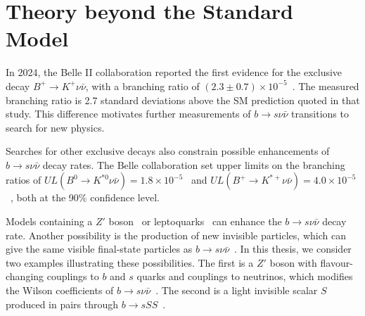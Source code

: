 \section{Theory beyond the Standard Model}
In 2024, the Belle II collaboration reported the first evidence for the exclusive decay $B^{+}\rightarrow K^{+}\nu\bar{\nu}$, with a branching ratio of $(2.3\pm0.7)\times10^{-5}$~\cite{Belle-II:2023esi}.
The measured branching ratio is 2.7 standard deviations above the SM prediction quoted in that study.
This difference motivates further measurements of $b\rightarrow s\nu\bar{\nu}$ transitions to search for new physics.

Searches for other exclusive decays also constrain possible enhancements of $b\rightarrow s\nu\bar{\nu}$ decay rates.
The Belle collaboration set upper limits on the branching ratios of $UL(B^{0}\rightarrow K^{*0}\nu\bar{\nu})=1.8\times10^{-5}$~\cite{Belle:2017oht} and $UL(B^{+}\rightarrow K^{*+}\nu\bar{\nu})=4.0\times10^{-5}$~\cite{Belle:2013tnz}, both at the 90\% confidence level.

Models containing a $Z'$ boson~\cite{Altmannshofer:2009ma} or leptoquarks~\cite{Sahoo:2016pet} can enhance the $b\rightarrow s\nu\bar{\nu}$ decay rate.
Another possibility is the production of new invisible particles, which can give the same visible final-state particles as $b\rightarrow s\nu\bar{\nu}$~\cite{Calcuttawala:2017usw}.
In this thesis, we consider two examples illustrating these possibilities.
The first is a $Z'$ boson with flavour-changing couplings to $b$ and $s$ quarks and couplings to neutrinos, which modifies the Wilson coefficients of $b\rightarrow s\nu\bar{\nu}$~\cite{Altmannshofer:2009ma}.
The second is a light invisible scalar $S$ produced in pairs through $b\rightarrow sSS$~\cite{Calcuttawala:2017usw}.

